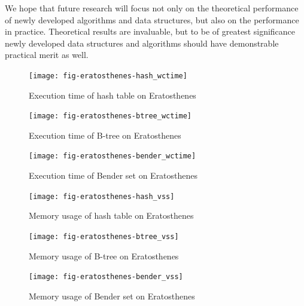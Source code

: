 \documentclass{acm_proc_article-sp}
\begin{document}
We hope that future research will focus not only on the theoretical performance
of newly developed algorithms and data structures, but also on the performance
in practice. Theoretical results are invaluable, but to be of greatest
significance newly developed data structures and algorithms should have
demonstrable practical merit as well.







\begin{figure}[p]
\centering
\texttt{[image: fig-eratosthenes-hash\_wctime]}
\caption{Execution time of hash table on Eratosthenes}
\label{fig-eratosthenes-hash_wctime}
\end{figure}

\begin{figure}[p]
\centering
\texttt{[image: fig-eratosthenes-btree\_wctime]}
\caption{Execution time of B-tree on Eratosthenes}
\label{fig-eratosthenes-btree_wctime}
\end{figure}

\begin{figure}[p]
\centering
\texttt{[image: fig-eratosthenes-bender\_wctime]}
\caption{Execution time of Bender set on Eratosthenes}
\label{fig-eratosthenes-bender_wctime}
\end{figure}

\begin{figure}[p]
\centering
\texttt{[image: fig-eratosthenes-hash\_vss]}
\caption{Memory usage of hash table on Eratosthenes}
\label{fig-eratosthenes-hash_vss}
\end{figure}

\begin{figure}[p]
\centering
\texttt{[image: fig-eratosthenes-btree\_vss]}
\caption{Memory usage of B-tree on Eratosthenes}
\label{fig-eratosthenes-btree_vss}
\end{figure}

\begin{figure}[p]
\centering
\texttt{[image: fig-eratosthenes-bender\_vss]}
\caption{Memory usage of Bender set on Eratosthenes}
\label{fig-eratosthenes-bender_vss}
\end{figure}
\end{document}
